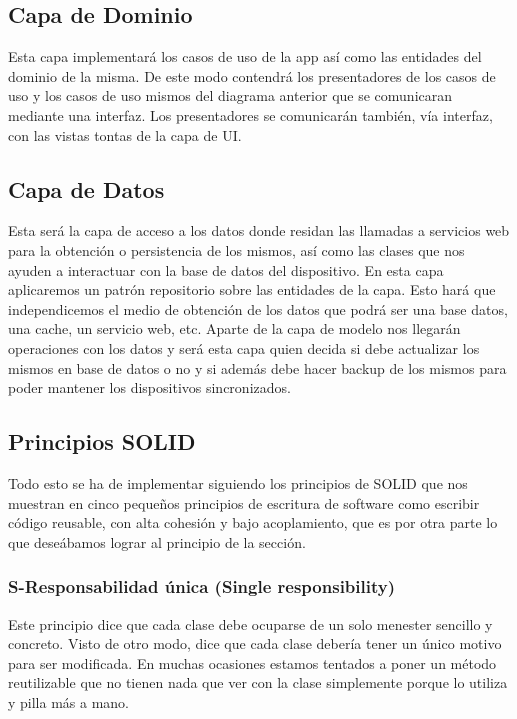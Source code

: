 \documentclass[../pfc.tex]{subfiles}
\begin{document}
	
	\subsection{Capa de Dominio}
	
	Esta capa implementará los casos de uso de la app así como las entidades del dominio de la misma. De este modo contendrá los presentadores de los casos de uso y los casos de uso mismos del diagrama anterior que se comunicaran mediante una interfaz. Los presentadores se comunicarán también, vía interfaz, con las vistas tontas de la capa de UI.\\
	
	
	\subsection{Capa de Datos}
	
	Esta será la capa de acceso a los datos donde residan las llamadas a servicios web para la obtención o persistencia de los mismos, así como las clases que nos ayuden a interactuar con la base de datos del dispositivo. En esta capa aplicaremos un patrón repositorio sobre las entidades de la capa. Esto hará que independicemos el medio de obtención de los datos que podrá ser una base datos, una cache, un servicio web, etc.
	Aparte de la capa de modelo nos llegarán operaciones con los datos y será esta capa quien decida si debe actualizar los mismos en base de datos o no y si además debe hacer backup de los mismos para poder mantener los dispositivos sincronizados.\\
	
	
	\subsection{Principios SOLID}
	
	Todo esto se ha de implementar siguiendo los principios de SOLID\cite{solid} que nos muestran en cinco pequeños principios de escritura de software como escribir código reusable, con alta cohesión y bajo acoplamiento, que es por otra parte lo que deseábamos lograr al principio de la sección.
	
	
	\subsubsection{S-Responsabilidad única (Single responsibility)}
	
	Este principio dice que cada clase debe ocuparse de un solo menester sencillo y concreto. Visto de otro modo, dice que cada clase debería tener un único motivo para ser modificada. En muchas ocasiones estamos tentados a poner un método reutilizable que no tienen nada que ver con la clase simplemente porque lo utiliza y pilla más a mano. \\
	
\end{document}
